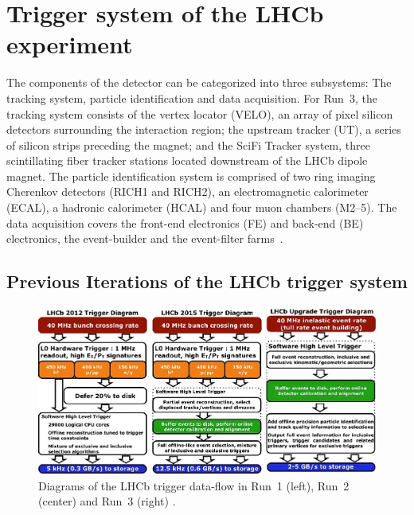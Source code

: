 \section{\label{sec:LHCb}Trigger system of the LHCb experiment}




The components of the detector can be categorized into three subsystems: The tracking system, particle identification and data acquisition. For Run~3, the tracking system consists of the vertex locator (VELO), an array of pixel silicon detectors surrounding the interaction region; the upstream tracker (UT), a series of silicon strips preceding the magnet; and the SciFi Tracker system, three scintillating fiber tracker stations located downstream of the LHCb dipole magnet. The particle identification system is comprised of two ring imaging Cherenkov detectors (RICH1 and RICH2), an electromagnetic calorimeter (ECAL), a hadronic calorimeter (HCAL) and four muon chambers (M2–5). The data acquisition covers the front-end electronics (FE) and back-end (BE) electronics, the event-builder and the event-filter farms~\cite{LHCb:2023hlw}.

\subsection{Previous Iterations of the LHCb trigger system}%


\begin{figure}[h!]
    \centering
    \includegraphics[width=1\linewidth]{images/lhcb/Diagrams-of-the-LHCb-trigger.png}
    \caption{Diagrams of the LHCb trigger data-flow in Run~1 (left), Run~2 (center) and  Run~3 (right) \cite{LHCb_Szumlak_2017}.}
    \label{lhcb-hlt}
\end{figure}

